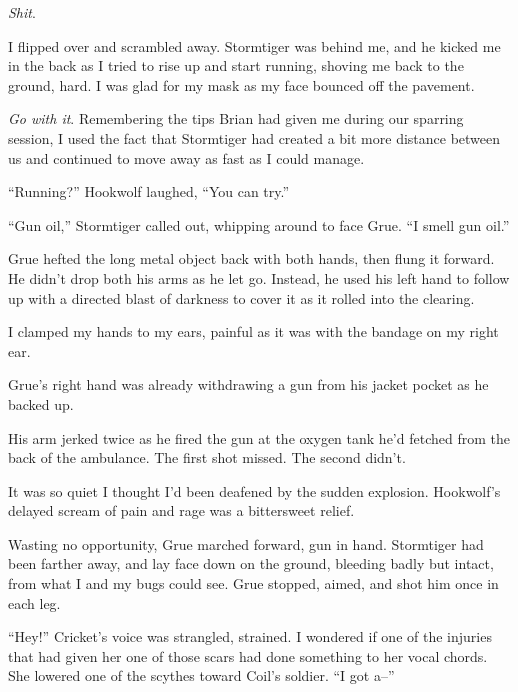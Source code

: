 \emph{Shit}.



I flipped over and scrambled away.  Stormtiger was behind me, and he kicked me in the back as I tried to rise up and start running, shoving me back to the ground, hard.  I was glad for my mask as my face bounced off the pavement.



\emph{Go with it}.  Remembering the tips Brian had given me during our sparring session, I used the fact that Stormtiger had created a bit more distance between us and continued to move away as fast as I could manage.



``Running?'' Hookwolf laughed, ``You can try.''



``Gun oil,'' Stormtiger called out, whipping around to face Grue.  ``I smell gun oil.''



Grue hefted the long metal object back with both hands, then flung it forward.  He didn't drop both his arms as he let go.  Instead, he used his left hand to follow up with a directed blast of darkness to cover it as it rolled into the clearing.



I clamped my hands to my ears, painful as it was with the bandage on my right ear.



Grue's right hand was already withdrawing a gun from his jacket pocket as he backed up.



His arm jerked twice as he fired the gun at the oxygen tank he'd fetched from the back of the ambulance.  The first shot missed.  The second didn't.



It was so quiet I thought I'd been deafened by the sudden explosion.  Hookwolf's delayed scream of pain and rage was a bittersweet relief.



Wasting no opportunity, Grue marched forward, gun in hand.  Stormtiger had been farther away, and lay face down on the ground, bleeding badly but intact, from what I and my bugs could see.  Grue stopped, aimed, and shot him once in each leg.



``Hey!'' Cricket's voice was strangled, strained.  I wondered if one of the injuries that had given her one of those scars had done something to her vocal chords.  She lowered one of the scythes toward Coil's soldier.  ``I got a--''



